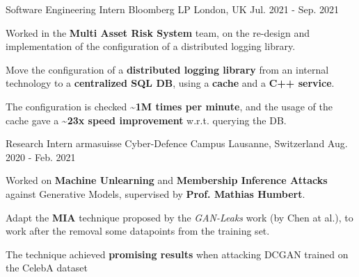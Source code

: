 

\begin{cventries}

  \cventry
  {Software Engineering Intern} %
  {Bloomberg LP} %
  {London, UK} %
  {Jul. 2021 - Sep. 2021} %
  {
    \begin{cvitems} %
      \item Worked in the \textbf{Multi Asset Risk System} team, on the re-design and implementation of the configuration of a distributed logging library.
      \item Move the configuration of a \textbf{distributed logging library} from an internal technology to a \textbf{centralized SQL DB}, using a \textbf{cache} and a \textbf{C++ service}.
      \item The configuration is checked \textbf{\textasciitilde 1M times per minute}, and the usage of the cache gave a \textbf{\textasciitilde 23x speed improvement} w.r.t. querying the DB.
    \end{cvitems}
  }

  \cventry
  {Research Intern} %
  {armasuisse Cyber-Defence Campus} %
  {Lausanne, Switzerland} %
  {Aug. 2020 - Feb. 2021} %
  {
    \begin{cvitems} %
      \item Worked on \textbf{Machine Unlearning} and \textbf{Membership Inference Attacks} against Generative Models, supervised by \textbf{Prof. Mathias Humbert}.
      \item Adapt the \textbf{MIA} technique proposed by the \textit{GAN-Leaks} work (by Chen at al.), to work after the removal some datapoints from the training set.
      \item The technique achieved \textbf{promising results} when attacking DCGAN trained on the CelebA dataset
    \end{cvitems}
  }


\end{cventries}
